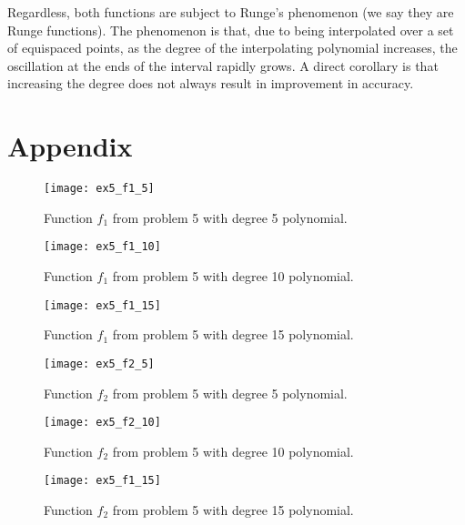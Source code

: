 \documentclass[12pt, a4paper]{article}
\begin{document}
Regardless, both functions are subject to Runge's phenomenon (we say they are
Runge functions). The phenomenon is that, due to being interpolated over a set
of equispaced points, as the degree of the interpolating polynomial increases,
the oscillation at the ends of the interval rapidly grows. A direct corollary is
that increasing the degree does not always result in improvement in accuracy.

\section{Appendix}

\begin{figure}
\texttt{[image: ex5\_f1\_5]}
\caption{Function $f_1$ from problem 5 with degree 5 polynomial.}
\label{fig:ex5_f1_5}
\end{figure}
\begin{figure}
\texttt{[image: ex5\_f1\_10]}
\caption{Function $f_1$ from problem 5 with degree 10 polynomial.}
\label{fig:ex5_f1_10}
\end{figure}
\begin{figure}
\texttt{[image: ex5\_f1\_15]}
\caption{Function $f_1$ from problem 5 with degree 15 polynomial.}
\label{fig:ex5_f1_15}
\end{figure}
\begin{figure}
\texttt{[image: ex5\_f2\_5]}
\caption{Function $f_2$ from problem 5 with degree 5 polynomial.}
\label{fig:ex5_f2_5}
\end{figure}
\begin{figure}
\texttt{[image: ex5\_f2\_10]}
\caption{Function $f_2$ from problem 5 with degree 10 polynomial.}
\label{fig:ex5_f2_10}
\end{figure}
\begin{figure}
\texttt{[image: ex5\_f1\_15]}
\caption{Function $f_2$ from problem 5 with degree 15 polynomial.}
\label{fig:ex5_f2_15}
\end{figure}
\end{document}
